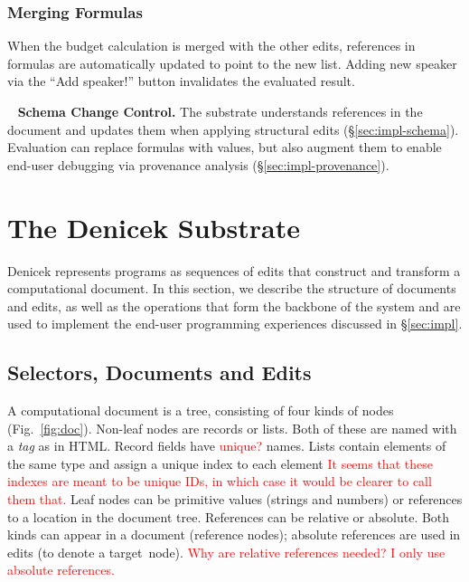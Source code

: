 \documentclass[sigconf,anonymous,screen]{acmart}
\newcommand{\note}[1]{\textcolor{red}{#1}}
\newcommand*\circled[1]{\textnormal{\footnotesize\sffamily\bfseries\protect\tikz[baseline=(char.base)]{
  \node[shape=circle,fill=black,text=white,draw,inner sep=1pt] (char) {#1};}}}
\DeclareRobustCommand{\keyideabox}[3]{\begin{tcolorbox}[breakable,
  boxsep=5pt,left=0pt,right=0pt,top=0pt,bottom=0pt,width=\dimexpr\columnwidth\relax,
  colback=gray!20,colframe=gray!20,
  enlarge bottom by=0pt,enlarge top by=0pt,
  arc=0pt,outer arc=0pt]
\lettrine[lraise=0.3]{\LARGE #1}{~}
\small \textbf{#2.} #3
\end{tcolorbox}
}
\begin{document}
\subsubsection*{\circled{G} Merging Formulas} When the budget calculation is merged with the
other edits, references in formulas are automatically updated to point to the new list.
Adding new speaker via the ``Add speaker!'' button invalidates the evaluated result.

\keyideabox{\faLightbulbO}{Schema Change Control}{The substrate understands references in
the document and updates them when applying structural edits (\S\ref{sec:impl-schema}).
Evaluation can replace formulas with values, but also augment them to enable
end-user debugging via provenance analysis (\S\ref{sec:impl-provenance}).}


\section{The Denicek Substrate}
\label{sec:system}
Denicek represents programs as sequences of edits that construct and transform a computational
document. In this section, we describe the structure of documents and edits, as well as the
operations that form the backbone of the system and are used to implement the
end-user programming experiences discussed in \S\ref{sec:impl}.


\subsection{Selectors, Documents and Edits}
A computational document is a tree, consisting of four kinds of nodes (Fig.~\ref{fig:doc}).
Non-leaf nodes are records or lists. Both of these are named with a \emph{tag} as in HTML. Record fields have \note{unique?} names. Lists contain elements of the same type and assign a unique index to each element \note{It seems that these indexes are meant to be unique IDs, in which case it would be clearer to call them that.}
Leaf nodes can be primitive values (strings and numbers) or references to a location in the document tree.
References can be relative or absolute. Both kinds can appear in a
document (reference nodes); absolute references are used in edits (to denote a target~node).
\note{Why are relative references needed? I only use absolute references.}
\end{document}
